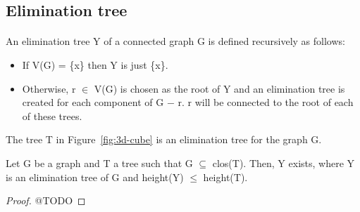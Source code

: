 \subsection{Elimination tree}
\paragraph{}
An elimination tree Y of a connected graph G is defined recursively as follows:
\begin{itemize}
  \item If V(G) = \{x\} then Y is just \{x\}.
  \item Otherwise, r $\in$ V(G) is chosen as the root of Y and an elimination tree is created for each component of G $-$ r. r will be connected to the root of each of these trees.
\end{itemize}
The tree T in Figure~\ref{fig:3d-cube} is an elimination tree for the graph G.

\begin{lemma}
\label{lema:min-ET}
Let G be a graph and T a tree such that G $\subseteq$ clos(T). Then, Y exists, where Y is an elimination tree of G and height(Y) $\leq$ height(T).
\end{lemma}

\begin{proof}
@TODO
\end{proof}

\paragraph{} 